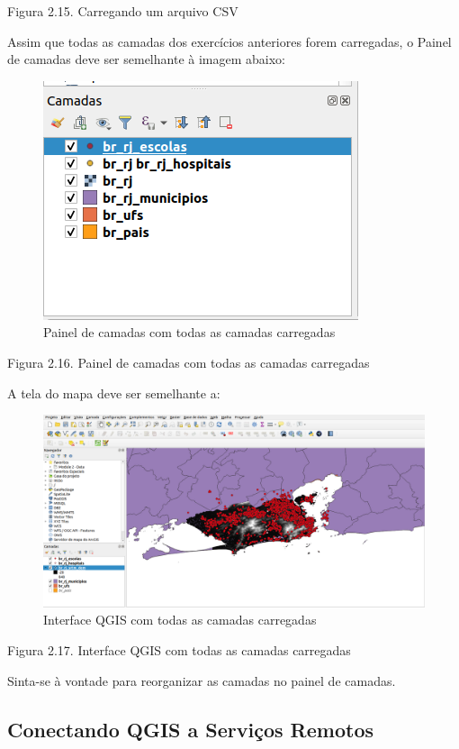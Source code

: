 \documentclass[
  portuguese,
]{krantz}
\begin{document}
Figura 2.15. Carregando um arquivo CSV

Assim que todas as camadas dos exercícios anteriores forem carregadas, o Painel de camadas deve ser semelhante à imagem abaixo:

\begin{figure}
\centering
\includegraphics{media/modulo2/layers-panel-2.png}
\caption{Painel de camadas com todas as camadas carregadas}
\end{figure}

Figura 2.16. Painel de camadas com todas as camadas carregadas

A tela do mapa deve ser semelhante a:

\begin{figure}
\centering
\includegraphics{media/modulo2/map-canvas-1.png}
\caption{Interface QGIS com todas as camadas carregadas}
\end{figure}

Figura 2.17. Interface QGIS com todas as camadas carregadas

Sinta-se à vontade para reorganizar as camadas no painel de camadas.

\hypertarget{conectando-qgis-a-serviuxe7os-remotos}{%
\subsection{\texorpdfstring{\textbf{Conectando QGIS a Serviços Remotos}}{Conectando QGIS a Serviços Remotos}}\label{conectando-qgis-a-serviuxe7os-remotos}}
\end{document}
